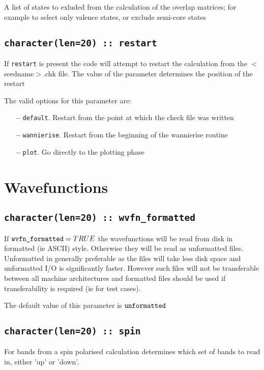 A list of states to exluded from the calculation of the overlap matrices; for example to select only valence states, or exclude semi-core states

\subsection[restart]{\tt character(len=20) :: restart}

If \verb#restart# is present the code will attempt to restart the calculation
from the $<$seedname$>$.chk file. The value of the parameter
determines the position of the restart

The valid options for this parameter are:
\begin{itemize}
\item[{\bf --}]  \verb#default#. Restart from the point at which the
  check file was written  
\item[{\bf --}]  \verb#wannierise#. Restart from the beginning of the
  wannierise routine 
\item[{\bf --}]  \verb#plot#. Go directly to the plotting phase 


\end{itemize}



\section{Wavefunctions}



\subsection[wvfn\_formated]{\tt character(len=20) :: wvfn\_formatted}

If $\verb#wvfn_formatted#=TRUE$ the wavefunctions will be read from disk
in formatted (ie ASCII) style. Otherwise they will be read as unformatted
files. Unformatted in generally preferable as the files will take less disk
space and unformatted I/O is significantly faster. However such files
will not be transferable between all machine architectures and formatted
files should be used if transferability is required (ie for test cases).

The default value of this parameter is $\verb#unformatted#$


\subsection[spin]{\tt character(len=20) :: spin}
For bands from a spin polarised calculation determines which set
of bands to read in, either 'up' or 'down'.

